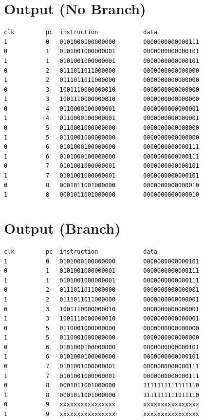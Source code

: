 \documentclass{article}
\newenvironment{problem}[1]{
  \nobreak\section*{#1}
}{}
\begin{document}
  \begin{problem}{Output (No Branch)}
    \begin{center}
      \begin{lstlisting}[basicstyle=\footnotesize\ttfamily]
clk         pc  instruction             data
1           0   0101000100000000        0000000000000111
0           1   0101001000000001        0000000000000101
1           1   0101001000000001        0000000000000101
0           2   0111011011000000        0000000000000000
1           2   0111011011000000        0000000000000000
0           3   1001110000000010        0000000000000000
1           3   1001110000000010        0000000000000000
0           4   0110000100000001        0000000000000001
1           4   0110000100000001        0000000000000001
0           5   0110001000000000        0000000000000000
1           5   0110001000000000        0000000000000000
0           6   0101000100000000        0000000000000111
1           6   0101000100000000        0000000000000111
0           7   0101001000000001        0000000000000101
1           7   0101001000000001        0000000000000101
0           8   0001011001000000        0000000000000010
1           8   0001011001000000        0000000000000010
      \end{lstlisting}
    \end{center}
  \end{problem}

  \begin{problem}{Output (Branch)}
    \begin{center}
      \begin{lstlisting}[basicstyle=\footnotesize\ttfamily]
clk         pc  instruction             data
1           0   0101000100000000        0000000000000101
0           1   0101001000000001        0000000000000111
1           1   0101001000000001        0000000000000111
0           2   0111011011000000        0000000000000001
1           2   0111011011000000        0000000000000001
0           3   1001110000000010        0000000000000001
1           3   1001110000000010        0000000000000001
0           5   0110001000000000        0000000000000000
1           5   0110001000000000        0000000000000000
0           6   0101000100000000        0000000000000101
1           6   0101000100000000        0000000000000101
0           7   0101001000000001        0000000000000111
1           7   0101001000000001        0000000000000111
0           8   0001011001000000        1111111111111110
1           8   0001011001000000        1111111111111110
0           9   xxxxxxxxxxxxxxxx        xxxxxxxxxxxxxxxx
1           9   xxxxxxxxxxxxxxxx        xxxxxxxxxxxxxxxx
      \end{lstlisting}
    \end{center}
  \end{problem}
\end{document}

